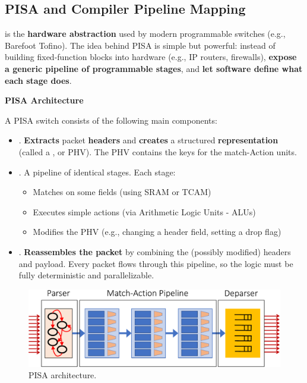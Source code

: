 \subsection{PISA and Compiler Pipeline Mapping}

 is the \textbf{hardware abstraction} used by modern programmable switches (e.g., Barefoot Tofino). The idea behind PISA is simple but powerful: instead of building fixed-function blocks into hardware (e.g., IP routers, firewalls), \textbf{expose a generic pipeline of programmable stages}, and \textbf{let software define what each stage does}.

\highspace
\begin{flushleft}
    \textcolor{Green3}{ \textbf{PISA Architecture}}
\end{flushleft}
A PISA switch consists of the following main components:
\begin{itemize}
    \item {}. \textbf{Extracts} packet \textbf{headers} and \textbf{creates} a structured \textbf{representation} (called a , or PHV). The PHV contains the keys for the match-Action units.
    
    \item {}. A pipeline of identical stages. Each stage:
    \begin{itemize}
        \item Matches on some fields (using SRAM or TCAM)
        \item Executes simple actions (via Arithmetic Logic Units - ALUs)
        \item Modifies the PHV (e.g., changing a header field, setting a drop flag)
    \end{itemize}
    
    \item {}. \textbf{Reassembles the packet} by combining the (possibly modified) headers and payload. Every packet flows through this pipeline, so the logic must be fully deterministic and parallelizable.
\end{itemize}

\begin{figure}[!htp]
    \centering
    \includegraphics[width=\textwidth]{img/pisa-arch.pdf}
    \caption{PISA architecture.}
\end{figure}

